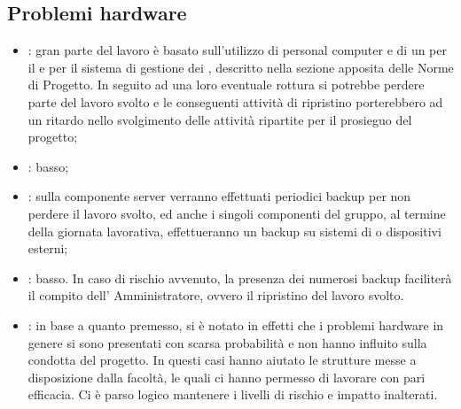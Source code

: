 \subsection{Problemi hardware}
\begin{itemize}
\item {}: gran parte del lavoro è basato sull'utilizzo di personal computer e di un  per il  e per il sistema di gestione dei , descritto nella sezione apposita delle Norme di Progetto. In seguito ad una loro eventuale rottura si potrebbe perdere parte del lavoro svolto e le conseguenti attività di ripristino porterebbero ad un ritardo nello svolgimento delle attività ripartite per il prosieguo del progetto;
\item {}: basso;
\item {}: sulla componente server verranno effettuati periodici backup per non perdere il lavoro svolto, ed anche i singoli componenti del gruppo, al termine della giornata lavorativa, effettueranno un backup su sistemi di  o dispositivi  esterni;
\item {}: basso. In caso di rischio avvenuto, la presenza dei numerosi backup faciliterà il compito dell' Amministratore, ovvero il ripristino del lavoro svolto.
\item {}: in base a quanto premesso, si è notato in effetti che i problemi hardware in genere si sono presentati con scarsa probabilità e non hanno influito sulla condotta del progetto. In questi casi hanno aiutato le strutture messe a disposizione dalla facoltà, le quali ci hanno permesso di lavorare con pari efficacia. Ci è parso logico mantenere i livelli di rischio e impatto inalterati.
\end{itemize}